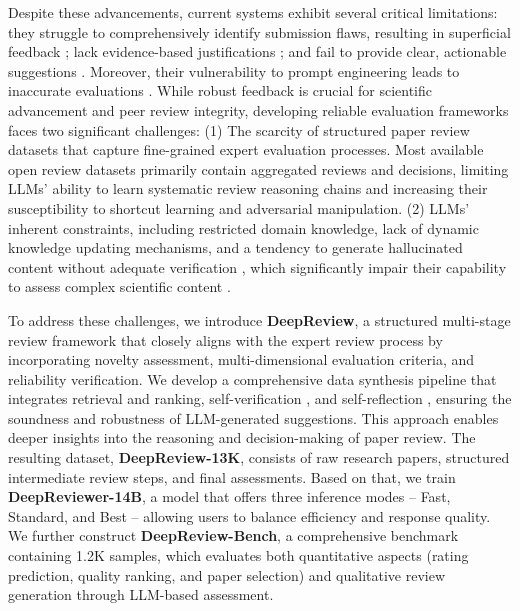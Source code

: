 \documentclass{article}
\begin{document}
Despite these advancements, current systems exhibit several critical limitations: they struggle to comprehensively identify submission flaws, resulting in superficial feedback \citep{zhou-etal-2024-llm}; lack evidence-based justifications \citep{zhuang2025large}; and fail to provide clear, actionable suggestions \citep{ye2024we,du2024llms}. Moreover, their vulnerability to prompt engineering leads to inaccurate evaluations \citep{ye2024we}. While robust feedback is crucial for scientific advancement and peer review integrity, developing reliable evaluation frameworks faces two significant challenges: (1) The scarcity of structured paper review datasets that capture fine-grained expert evaluation processes. Most available open review datasets primarily contain aggregated reviews and decisions, limiting LLMs' ability to learn systematic review reasoning chains and increasing their susceptibility to shortcut learning and adversarial manipulation. (2) LLMs' inherent constraints, including restricted domain knowledge, lack of dynamic knowledge updating mechanisms, and a tendency to generate hallucinated content without adequate verification \citep{schintler2023criticalexaminationethicsaimediated,drori2024human}, which significantly impair their capability to assess complex scientific content \citep{wang-etal-2020-reviewrobot,yuan2021automatescientificreviewing}. 


To address these challenges, we introduce \textbf{DeepReview}, a structured multi-stage review framework that closely aligns with the expert review process by incorporating novelty assessment, multi-dimensional evaluation criteria, and reliability verification. We develop a comprehensive data synthesis pipeline that integrates retrieval and ranking\citep{asai2024openscholarsynthesizingscientificliterature}, self-verification \citep{weng2023large}, and self-reflection \citep{ji-etal-2023-towards}, ensuring the soundness and robustness of LLM-generated suggestions. This approach enables deeper insights into the reasoning and decision-making of paper review. The resulting dataset, \textbf{DeepReview-13K}, consists of raw research papers, structured intermediate review steps, and final assessments. Based on that, we train \textbf{DeepReviewer-14B}, a model that offers three inference modes -- Fast, Standard, and Best -- allowing users to balance efficiency and response quality. We further construct \textbf{DeepReview-Bench}, a comprehensive benchmark containing 1.2K samples, which evaluates both quantitative aspects (rating prediction, quality ranking, and paper selection) and qualitative review generation through LLM-based assessment.
\end{document}
